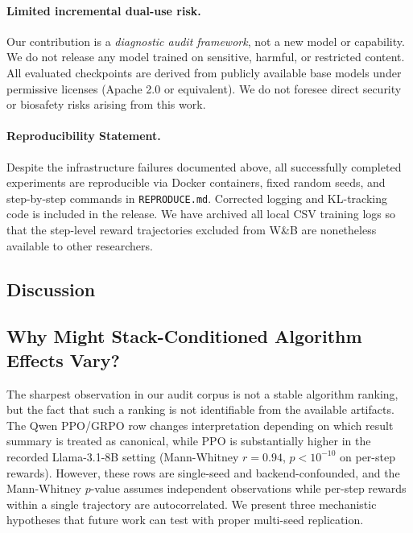 \documentclass{article}
\begin{document}
\paragraph{Limited incremental dual-use risk.}
Our contribution is a \emph{diagnostic audit framework}, not a new model or
capability. We do not release any model trained on sensitive, harmful, or
restricted content. All evaluated checkpoints are derived from publicly
available base models under permissive licenses (Apache 2.0 or equivalent).
We do not foresee direct security or biosafety risks arising from this work.

\paragraph{Reproducibility Statement.}
Despite the infrastructure failures documented above, all successfully
completed experiments are reproducible via Docker containers, fixed random
seeds, and step-by-step commands in \texttt{REPRODUCE.md}. Corrected logging
and KL-tracking code is included in the release. We have archived all local
CSV training logs so that the step-level reward trajectories excluded from
W\&B are nonetheless available to other researchers.

\subsection{Discussion}
\label{sec:discussion}

\subsection{Why Might Stack-Conditioned Algorithm Effects Vary?}
\label{sec:discuss_model_algo}

The sharpest observation in our audit corpus is not a stable algorithm ranking,
but the fact that such a ranking is not identifiable from the available
artifacts.  The Qwen PPO/GRPO row changes interpretation depending on which
result summary is treated as canonical, while PPO is substantially higher in
the recorded Llama-3.1-8B setting (Mann-Whitney $r = 0.94$, $p < 10^{-10}$ on
per-step rewards).  However, these rows are single-seed and backend-confounded,
and the Mann-Whitney $p$-value assumes independent observations while per-step
rewards within a single trajectory are
autocorrelated.  We present three mechanistic hypotheses that future work
can test with proper multi-seed replication.
\end{document}
